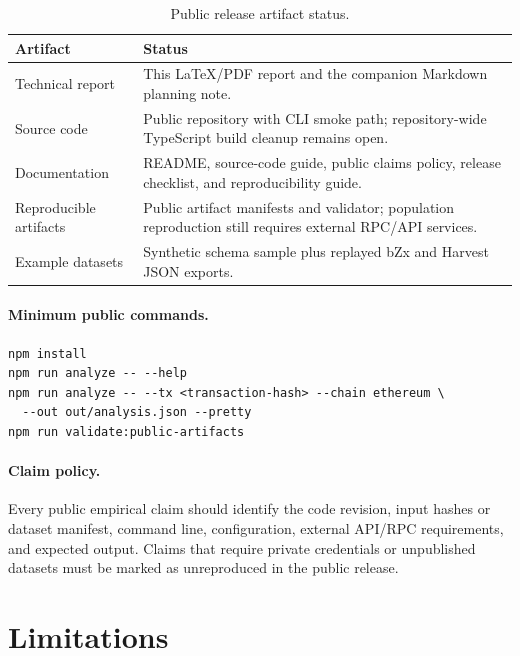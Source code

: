 \documentclass[10pt]{article}
\begin{document}
\begin{table}[t]
\centering
\caption{Public release artifact status.}
\label{tab:artifacts}
\begin{tabularx}{\linewidth}{lX}
\toprule
Artifact & Status \\
\midrule
Technical report & This LaTeX/PDF report and the companion Markdown planning note. \\
Source code & Public repository with CLI smoke path; repository-wide TypeScript build cleanup remains open. \\
Documentation & README, source-code guide, public claims policy, release checklist, and reproducibility guide. \\
Reproducible artifacts & Public artifact manifests and validator; population reproduction still requires external RPC/API services. \\
Example datasets & Synthetic schema sample plus replayed bZx and Harvest JSON exports. \\
\bottomrule
\end{tabularx}
\end{table}

\paragraph{Minimum public commands.}
\begin{verbatim}
npm install
npm run analyze -- --help
npm run analyze -- --tx <transaction-hash> --chain ethereum \
  --out out/analysis.json --pretty
npm run validate:public-artifacts
\end{verbatim}

\paragraph{Claim policy.}
Every public empirical claim should identify the code revision, input hashes or
dataset manifest, command line, configuration, external API/RPC requirements,
and expected output. Claims that require private credentials or unpublished
datasets must be marked as unreproduced in the public release.

\section{Limitations}
\label{sec:limitations}
\end{document}
